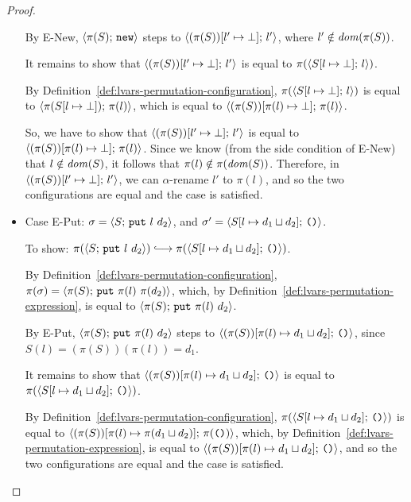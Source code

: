 \begin{proof}
\begin{itemize}
      By {\sc E-New}, $\langle \pi(S);\, \mbox{\texttt{new}} \rangle$ steps to
      $\langle (\pi(S))[l' \mapsto \bot];\, l' \rangle$, where $l' \notin
      \mathit{dom}(\pi(S))$.
      
      It remains to show that
      $\langle (\pi(S))[l' \mapsto \bot];\, l' \rangle$ is equal to
      $\pi(\langle S[l \mapsto \bot];\, l \rangle)$.

      By Definition~\ref{def:lvars-permutation-configuration},
      $\pi(\langle S[l \mapsto \bot];\, l \rangle)$ is equal to
      $\langle \pi(S[l \mapsto \bot]);\, \pi(l) \rangle$, which is equal to
      $\langle (\pi(S))[\pi(l) \mapsto \bot];\, \pi(l) \rangle$.

      So, we have to show that
      $\langle (\pi(S))[l' \mapsto \bot];\, l' \rangle$ is equal to
      $\langle (\pi(S))[\pi(l) \mapsto \bot];\, \pi(l) \rangle$.  Since we
      know (from the side condition of {\sc E-New}) that $l \notin
      \mathit{dom}(S)$, it follows that $\pi(l) \notin \pi(\mathit{dom}(S))$.
      Therefore, in $\langle (\pi(S))[l' \mapsto \bot];\, l' \rangle$, we
      can $\alpha$-rename $l'$ to $\pi(l)$, and so the two
      configurations are equal and the case is satisfied.

    \item Case {\sc E-Put}: $\sigma = \langle S;\, \mbox{\texttt{put}}~l~d_2 \rangle$, and
      $\sigma' = \langle S[l \mapsto d_1 \sqcup d_2];\, \mbox{\texttt{()}} \rangle$.

      To show: $\pi(\config{S}{\putexp{l}{d_2}}) \parstepsto
      \pi(\config{\extSRaw{S}{l}{\userlub{d_1}{d_2}}}{\unit})$.

      By Definition~\ref{def:lvars-permutation-configuration},
      $\pi(\sigma) = \langle \pi(S);\, \mbox{\texttt{put}}~\pi(l)~\pi(d_2) \rangle$,
      which, by Definition~\ref{def:lvars-permutation-expression}, is
      equal to $\langle \pi(S);\, \mbox{\texttt{put}}~\pi(l)~d_2 \rangle$.

      By {\sc E-Put}, $\langle \pi(S);\, \mbox{\texttt{put}}~\pi(l)~d_2 \rangle$ steps to
      $\langle (\pi(S))[\pi(l) \mapsto d_1 \sqcup d_2];\, \mbox{\texttt{()}} \rangle$,
      since $S(l) = (\pi(S))(\pi(l)) = d_1$.

      It remains to show that
      $\langle (\pi(S))[\pi(l) \mapsto d_1 \sqcup d_2];\, \mbox{\texttt{()}} \rangle$
      is equal to
      $\pi(\langle S[l \mapsto d_1 \sqcup d_2];\, \mbox{\texttt{()}} \rangle)$.

      By Definition~\ref{def:lvars-permutation-configuration},
      $\pi(\langle S[l \mapsto d_1 \sqcup d_2];\, \mbox{\texttt{()}} \rangle)$ is
      equal to
      $\langle (\pi(S))[\pi(l) \mapsto \pi(d_1 \sqcup d_2)];\, \pi(\mbox{\texttt{()}}) \rangle$,
      which, by Definition~\ref{def:lvars-permutation-expression}, is
      equal to
      $\langle (\pi(S))[\pi(l) \mapsto d_1 \sqcup d_2];\, \mbox{\texttt{()}} \rangle$,
      and so the two configurations are equal and the case is
      satisfied.


\end{itemize}
\end{proof}
